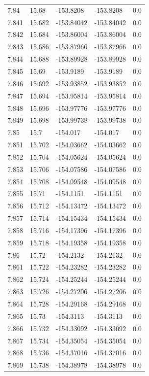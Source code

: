 \begin{tabular}{lllll}
7.84 & 15.68 & -153.8208 & -153.8208 & 0.0 \\
7.841 & 15.682 & -153.84042 & -153.84042 & 0.0 \\
7.842 & 15.684 & -153.86004 & -153.86004 & 0.0 \\
7.843 & 15.686 & -153.87966 & -153.87966 & 0.0 \\
7.844 & 15.688 & -153.89928 & -153.89928 & 0.0 \\
7.845 & 15.69 & -153.9189 & -153.9189 & 0.0 \\
7.846 & 15.692 & -153.93852 & -153.93852 & 0.0 \\
7.847 & 15.694 & -153.95814 & -153.95814 & 0.0 \\
7.848 & 15.696 & -153.97776 & -153.97776 & 0.0 \\
7.849 & 15.698 & -153.99738 & -153.99738 & 0.0 \\
7.85 & 15.7 & -154.017 & -154.017 & 0.0 \\
7.851 & 15.702 & -154.03662 & -154.03662 & 0.0 \\
7.852 & 15.704 & -154.05624 & -154.05624 & 0.0 \\
7.853 & 15.706 & -154.07586 & -154.07586 & 0.0 \\
7.854 & 15.708 & -154.09548 & -154.09548 & 0.0 \\
7.855 & 15.71 & -154.1151 & -154.1151 & 0.0 \\
7.856 & 15.712 & -154.13472 & -154.13472 & 0.0 \\
7.857 & 15.714 & -154.15434 & -154.15434 & 0.0 \\
7.858 & 15.716 & -154.17396 & -154.17396 & 0.0 \\
7.859 & 15.718 & -154.19358 & -154.19358 & 0.0 \\
7.86 & 15.72 & -154.2132 & -154.2132 & 0.0 \\
7.861 & 15.722 & -154.23282 & -154.23282 & 0.0 \\
7.862 & 15.724 & -154.25244 & -154.25244 & 0.0 \\
7.863 & 15.726 & -154.27206 & -154.27206 & 0.0 \\
7.864 & 15.728 & -154.29168 & -154.29168 & 0.0 \\
7.865 & 15.73 & -154.3113 & -154.3113 & 0.0 \\
7.866 & 15.732 & -154.33092 & -154.33092 & 0.0 \\
7.867 & 15.734 & -154.35054 & -154.35054 & 0.0 \\
7.868 & 15.736 & -154.37016 & -154.37016 & 0.0 \\
7.869 & 15.738 & -154.38978 & -154.38978 & 0.0 \\

\end{tabular}
